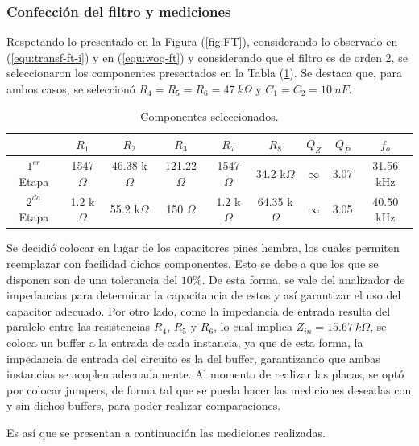 \subsubsection{Confección del filtro y mediciones}

Respetando lo presentado en la Figura (\ref{fig:FT}), considerando lo observado en (\ref{equ:transf-ft-i}) y en (\ref{equ:woq-ft}) y considerando que el filtro es de orden 2, se seleccionaron los componentes presentados en la Tabla (\ref{tab:componentes}). Se destaca que, para ambos casos, se seleccionó $R_4 = R_5 = R_6 = 47 \ k\Omega$ y $C_1 = C_2 = 10 \ nF$.

\begin{table}[H]
\centering
\begin{tabular}{ccccccccc}
\hline 
 & $R_1$ & $R_2$ & $R_3$ & $R_7$ & $R_8$ & $Q_Z$ & $Q_P$ & $f_o$ \\
 \hline
$1^{er}$ Etapa & 1547 $\Omega$ & 46.38 k$\Omega$ & 121.22 $\Omega$ & 1547 $\Omega$ & 34.2 k$\Omega$ & $\infty$ & 3.07 & 31.56 kHz \\
$2^{da}$ Etapa & 1.2 k$\Omega$ & 55.2 k$\Omega$ & 150 $\Omega$ & 1.2 k$\Omega$ & 64.35 k$\Omega$ & $\infty$ & 3.05 & 40.50 kHz \\
\hline
\end{tabular}
\caption{Componentes seleccionados.}
\label{tab:componentes}
\end{table} 

Se decidió colocar en lugar de los capacitores pines hembra, los cuales permiten reemplazar con facilidad dichos componentes. Esto se debe a que los que se disponen son de una tolerancia del $10 \%$. De esta forma, se vale del analizador de impedancias para determinar la capacitancia de estos y así garantizar el uso del capacitor adecuado. Por otro lado, como la impedancia de entrada resulta del paralelo entre las resistencias $R_4$, $R_5$ y $R_6$, lo cual implica $Z_{in} = 15.67 \ k\Omega$, se coloca un buffer a la entrada de cada instancia, ya que de esta forma, la impedancia de entrada del circuito es la del buffer, garantizando que ambas instancias se acoplen adecuadamente. 
Al momento de realizar las placas, se optó por colocar jumpers, de forma tal que se pueda hacer las mediciones deseadas con y sin dichos buffers, para poder realizar comparaciones.   

Es así que se presentan a continuación las mediciones realizadas.

